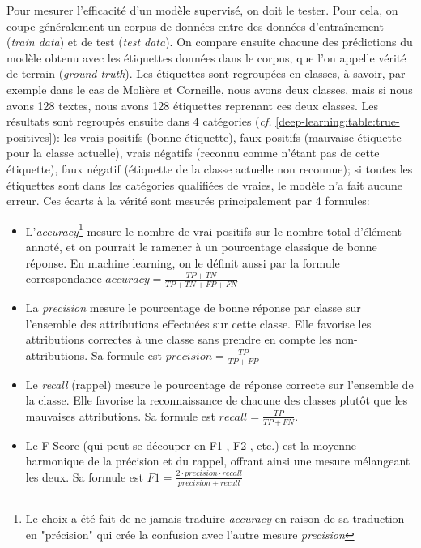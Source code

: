 Pour mesurer l'efficacité d'un modèle supervisé, on doit le tester. Pour cela, on coupe généralement un corpus de données entre des données d'entraînement (\textit{train data}) et de test (\textit{test data}). On compare ensuite chacune des prédictions du modèle obtenu avec les étiquettes données dans le corpus, que l'on appelle vérité de terrain (\textit{ground truth}). Les étiquettes sont regroupées en classes, à savoir, par exemple dans le cas de Molière et Corneille, nous avons deux classes, mais si nous avons 128 textes, nous avons 128 étiquettes reprenant ces deux classes. Les résultats sont regroupés ensuite dans 4 catégories (\textit{cf.} \ref{deep-learning:table:true-positives}): les vrais positifs (bonne étiquette), faux positifs (mauvaise étiquette pour la classe actuelle), vrais négatifs (reconnu comme n'étant pas de cette étiquette), faux négatif (étiquette de la classe actuelle non reconnue); si toutes les étiquettes sont dans les catégories qualifiées de vraies, le modèle n'a fait aucune erreur. Ces écarts à la vérité sont mesurés principalement par 4 formules:
\begin{itemize}
    \item L'\textit{accuracy}\footnote{Le choix a été fait de ne jamais traduire \textit{accuracy} en raison de sa traduction en "précision" qui crée la confusion avec l'autre mesure \textit{precision}} mesure le nombre de vrai positifs sur le nombre total d'élément annoté, et on pourrait le ramener à un pourcentage classique de bonne réponse. En machine learning, on le définit aussi par la formule correspondance $accuracy = \frac{TP + TN}{TP + TN + FP + FN}$
    \item La \textit{precision} mesure le pourcentage de bonne réponse par classe sur l'ensemble des attributions effectuées sur cette classe. Elle favorise les attributions correctes à une classe sans prendre en compte les non-attributions. Sa formule est $precision = \frac{TP}{TP + FP}$
    \item Le \textit{recall} (rappel) mesure le pourcentage de réponse correcte sur l'ensemble de la classe. Elle favorise la reconnaissance de chacune des classes plutôt que les mauvaises attributions. Sa formule est $recall = \frac{TP}{TP+FN}$.
    \item Le F-Score (qui peut se découper en F1-, F2-, etc.) est la moyenne harmonique de la précision et du rappel, offrant ainsi une mesure mélangeant les deux. Sa formule est $F1 = \frac{2 \cdot precision\cdot recall}{precision+ recall}$
\end{itemize}{}

